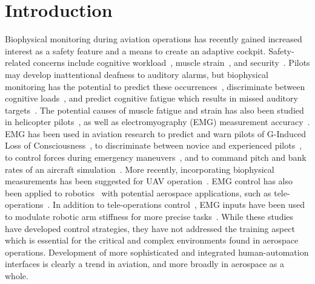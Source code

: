 \section{Introduction}
Biophysical monitoring during aviation operations has recently gained increased interest as a safety feature and a means to create an adaptive cockpit.
Safety-related concerns include cognitive workload~\citep{RN1, RN2}, muscle strain~\citep{RN3, RN4, RN5}, and security~\citep{RN6}.
Pilots may develop inattentional deafness to auditory alarms, but biophysical monitoring has the potential to predict these occurrences~\citep{RN7}, discriminate between cognitive loads~\citep{RN1}, and predict cognitive fatigue which results in missed auditory targets~\citep{RN2}.
The potential causes of muscle fatigue and strain has also been studied in helicopter pilots~\citep{RN3, RN4, RN5}, as well as electromyography (EMG) measurement accuracy~\citep{RN8}.
EMG has been used in aviation research to predict and warn pilots of G-Induced Loss of Consciousness~\citep{RN9, RN10}, to discriminate between novice and experienced pilots~\citep{RN11}, to control forces during emergency maneuvers~\citep{RN12}, and to command pitch and bank rates of an aircraft simulation~\citep{RN13}.
More recently, incorporating biophysical measurements has been suggested for UAV operation~\citep{RN14}.
EMG control has also been applied to robotics~\citep{RN15, RN16, RN17, RN18} with potential aerospace applications, such as tele-operations~\citep{RN19}.
In addition to tele-operations control~\citep{RN20, RN21}, EMG inputs have been used to modulate robotic arm stiffness for more precise tasks~\citep{RN22, RN23}.
While these studies have developed control strategies, they have not addressed the training aspect which is essential for the critical and complex environments found in aerospace operations.
Development of more sophisticated and integrated human-automation interfaces is clearly a trend in aviation, and more broadly in aerospace as a whole.


